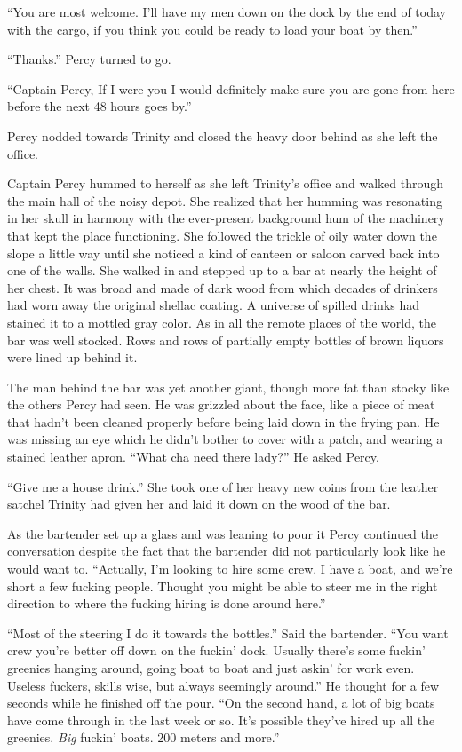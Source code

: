 \documentclass[
]{scrbook}
\begin{document}
``You are most welcome. I'll have my men down on the dock by the end of
today with the cargo, if you think you could be ready to load your boat
by then.''

``Thanks.'' Percy turned to go.

``Captain Percy, If I were you I would definitely make sure you are gone
from here before the next 48 hours goes by.''

Percy nodded towards Trinity and closed the heavy door behind as she
left the office.

Captain Percy hummed to herself as she left Trinity's office and walked
through the main hall of the noisy depot. She realized that her humming
was resonating in her skull in harmony with the ever-present background
hum of the machinery that kept the place functioning. She followed the
trickle of oily water down the slope a little way until she noticed a
kind of canteen or saloon carved back into one of the walls. She walked
in and stepped up to a bar at nearly the height of her chest. It was
broad and made of dark wood from which decades of drinkers had worn away
the original shellac coating. A universe of spilled drinks had stained
it to a mottled gray color. As in all the remote places of the world,
the bar was well stocked. Rows and rows of partially empty bottles of
brown liquors were lined up behind it.

The man behind the bar was yet another giant, though more fat than
stocky like the others Percy had seen. He was grizzled about the face,
like a piece of meat that hadn't been cleaned properly before being laid
down in the frying pan. He was missing an eye which he didn't bother to
cover with a patch, and wearing a stained leather apron. ``What cha need
there lady?'' He asked Percy.

``Give me a house drink.'' She took one of her heavy new coins from the
leather satchel Trinity had given her and laid it down on the wood of
the bar.

As the bartender set up a glass and was leaning to pour it Percy
continued the conversation despite the fact that the bartender did not
particularly look like he would want to. ``Actually, I'm looking to hire
some crew. I have a boat, and we're short a few fucking people. Thought
you might be able to steer me in the right direction to where the
fucking hiring is done around here.''

``Most of the steering I do it towards the bottles.'' Said the
bartender. ``You want crew you're better off down on the fuckin' dock.
Usually there's some fuckin' greenies hanging around, going boat to boat
and just askin' for work even. Useless fuckers, skills wise, but always
seemingly around.'' He thought for a few seconds while he finished off
the pour. ``On the second hand, a lot of big boats have come through in
the last week or so. It's possible they've hired up all the greenies.
\emph{Big} fuckin' boats. 200 meters and more.''
\end{document}

